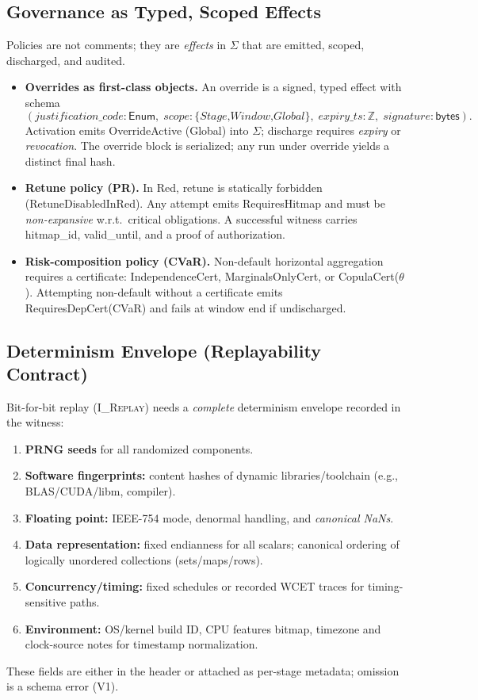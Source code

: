 \documentclass[11pt]{article}
\theoremstyle{plain}
\theoremstyle{definition}
\theoremstyle{remark}
\def\Sig{\Sigma}%
\def\code#1{#1}%
\DeclareRobustCommand{\Sig}{\texorpdfstring{\ensuremath{\Sigma}}{\Sigma}}   %
\newcommand{\code}[1]{\texttt{\textup{#1}}}    %
\newcommand{\IReplay}{\textsc{I\_Replay}}
\def\Sig{\Sigma}%
\def\code#1{#1}%
\begin{document}
\subsection{Governance as Typed, Scoped Effects}
Policies are not comments; they are \emph{effects} in $\Sig$ that are emitted, scoped, discharged, and audited.
\begin{itemize}[leftmargin=1.6em]
  \item \textbf{Overrides as first-class objects.} An override is a signed, typed effect with schema
  \[
    (\textit{justification\_code}:\textsf{Enum},\; \textit{scope}:\{\textit{Stage,Window,Global}\},\; \textit{expiry\_ts}:\mathbb{Z},\; \textit{signature}:\textsf{bytes}).
  \]
  Activation emits \code{OverrideActive} (Global) into $\Sig$; discharge requires \emph{expiry} or \emph{revocation}. The override block is serialized; any run under override yields a distinct final hash.
  \item \textbf{Retune policy (PR).} In Red, retune is statically forbidden (\code{RetuneDisabledInRed}). Any attempt emits \code{RequiresHitmap} and must be \emph{non-expansive} w.r.t.\ critical obligations. A successful witness carries \code{hitmap\_id}, \code{valid\_until}, and a proof of authorization.
  \item \textbf{Risk-composition policy (CVaR).} Non-default horizontal aggregation requires a \Sig{} certificate: \code{IndependenceCert}, \code{MarginalsOnlyCert}, or \code{CopulaCert($\theta$)}. Attempting non-default without a certificate emits \code{RequiresDepCert(CVaR)} and fails at window end if undischarged.
\end{itemize}

\subsection{Determinism Envelope (Replayability Contract)}
Bit-for-bit replay (\IReplay) needs a \emph{complete} determinism envelope recorded in the witness:
\begin{enumerate}[leftmargin=2em,label=(D\arabic*)]
  \item \textbf{PRNG seeds} for all randomized components.
  \item \textbf{Software fingerprints:} content hashes of dynamic libraries/toolchain (e.g., BLAS/CUDA/libm, compiler).
  \item \textbf{Floating point:} IEEE-754 mode, denormal handling, and \emph{canonical NaNs}.
  \item \textbf{Data representation:} fixed endianness for all scalars; canonical ordering of logically unordered collections (sets/maps/rows).
  \item \textbf{Concurrency/timing:} fixed schedules or recorded WCET traces for timing-sensitive paths.
  \item \textbf{Environment:} OS/kernel build ID, CPU features bitmap, timezone and clock-source notes for timestamp normalization.
\end{enumerate}
These fields are either in the header or attached as per-stage metadata; omission is a schema error (V1).
\end{document}
